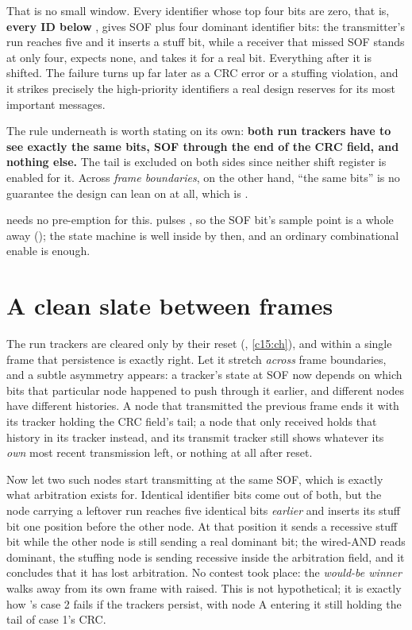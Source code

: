 That is no small window. Every identifier whose top four bits are zero, that is, \textbf{every ID
below }, gives SOF plus four dominant identifier bits: the transmitter's run reaches five
and it inserts a stuff bit, while a receiver that missed SOF stands at only four, expects none, and
takes it for a real bit. Everything after it is shifted. The failure turns up far later as a CRC error
or a stuffing violation, and it strikes precisely the high-priority identifiers a real design reserves
for its most important messages.

The rule underneath is worth stating on its own: \textbf{both run trackers have to see exactly the
same bits, SOF through the end of the CRC field, and nothing else.} The tail is excluded on both sides
since neither shift register is enabled for it. Across \emph{frame boundaries}, on the other hand,
``the same bits'' is no guarantee the design can lean on at all, which is
.

 needs no pre-emption for this.  pulses , so the
SOF bit's sample point is a whole  away (); the state machine is
well inside  by then, and an ordinary combinational enable is enough.

\section{A clean slate between frames}
\label{c17:sec:cleanslate}

The run trackers are cleared only by their reset (, \ref{c15:ch}), and within a
single frame that persistence is exactly right. Let it stretch \emph{across} frame boundaries, and a
subtle asymmetry appears: a tracker's state at SOF now depends on which bits that particular node
happened to push through it earlier, and different nodes have different histories. A node that
transmitted the previous frame ends it with its  tracker holding the CRC field's
tail; a node that only received holds that history in its  tracker instead, and its
transmit tracker still shows whatever its \emph{own} most recent transmission left, or nothing at all
after reset.

Now let two such nodes start transmitting at the same SOF, which is exactly what arbitration exists
for. Identical identifier bits come out of both, but the node carrying a leftover run reaches five
identical bits \emph{earlier} and inserts its stuff bit one position before the other node. At that
position it sends a recessive stuff bit while the other node is still sending a real dominant bit; the
wired-AND reads dominant, the stuffing node is sending recessive inside the arbitration field, and it
concludes that it has lost arbitration. No contest took place: the \emph{would-be winner} walks away
from its own frame with  raised. This is not hypothetical; it is exactly how
's case 2 fails if the trackers persist, with node A entering it still holding
the tail of case 1's CRC.


